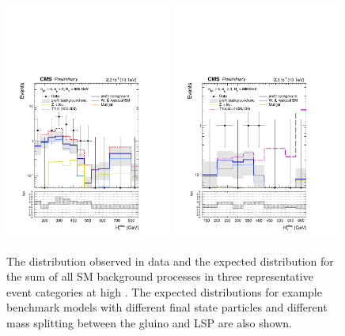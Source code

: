 %
%
%

\begin{figure}[tbhp]
  \begin{center}
    \includegraphics[width=0.49\textwidth]{figures/mht_shapes/v0/postFitShape_eq2b_ge5j_800_Inf_prefit_T1tttt_800_400} 
    \includegraphics[width=0.49\textwidth]{figures/mht_shapes/v0/postFitShape_ge3b_ge5j_800_Inf_prefit_T1bbbb_1400_100} \\
  \end{center}
  \caption{ The \HTmiss distribution observed in data and the expected
    distribution for the sum of all SM background processes in three 
    representative event categories at high \scalht. The expected
    distributions for example benchmark models with different final state 
    particles and different mass splitting between the gluino and LSP 
    are also shown. \label{fig:mht-templates} }
\end{figure}

